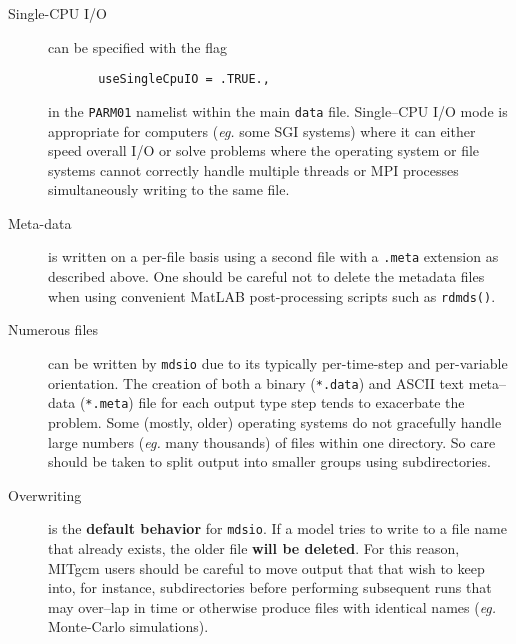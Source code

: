 \begin{description}
\item[Single-CPU I/O] can be specified with the flag
\begin{verbatim}
       useSingleCpuIO = .TRUE.,
\end{verbatim}
  in the \texttt{PARM01} namelist within the main \texttt{data} file.
  Single--CPU I/O mode is appropriate for computers (\textit{eg.} some
  SGI systems) where it can either speed overall I/O or solve problems
  where the operating system or file systems cannot correctly handle
  multiple threads or MPI processes simultaneously writing to the same
  file.

\item[Meta-data] is written on a per-file basis using a second file
  with a \texttt{.meta} extension as described above.  One should be
  careful not to delete the metadata files when using convenient
  MatLAB post-processing scripts such as \texttt{rdmds()}.

\item[Numerous files] can be written by \texttt{mdsio} due to its
  typically per-time-step and per-variable orientation.  The creation of
  both a binary (\texttt{*.data}) and ASCII text meta--data
  (\texttt{*.meta}) file for each output type step tends to exacerbate
  the problem.  Some (mostly, older) operating systems do not
  gracefully handle large numbers (\textit{eg.} many thousands) of
  files within one directory.  So care should be taken to split output
  into smaller groups using subdirectories.

\item[Overwriting] is the \textbf{default behavior} for
  \texttt{mdsio}.  If a model tries to write to a file name that
  already exists, the older file \textbf{will be deleted}.  For this
  reason, MITgcm users should be careful to move output that that wish
  to keep into, for instance, subdirectories before performing
  subsequent runs that may over--lap in time or otherwise produce
  files with identical names (\textit{eg.} Monte-Carlo simulations).


\end{description}
